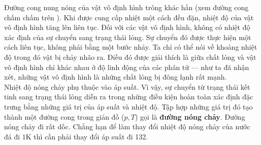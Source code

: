 Đường cong nung nóng của vật vô định hình trông khác hẳn (xem đường cong chấm chấm trên ). Khi được cung cấp nhiệt một cách đều đặn, nhiệt độ của vật vô định hình tăng lên liên tục. Đối với các vật vô định hình, không có nhiệt độ xác định của sự chuyển sang trạng thái lỏng. Sự chuyển đó được thực hiện một cách liên tục, không phải bằng một bước nhảy. Ta chỉ có thể nói về khoảng nhiệt độ trong đó vật bị chảy nhão ra. Điều đó được giải thích là giữa chất lỏng và vật vô định hình chỉ khác nhau ở độ linh động của các phân tử --- như ta đã nhận xét, những vật vô định hình là những chất lỏng bị đông lạnh rất mạnh.\\

Nhiệt độ nóng chảy phụ thuộc vào áp suất. Vì vậy, sự chuyển từ trạng thái kết tinh sang trạng thái lỏng diễn ra trong những điều kiện hoàn toàn xác định đặc trưng bằng những giá trị của áp suất và nhiệt độ. Tập hợp những giá trị đó tạo thành một đường cong trong giản đồ ($p,T$) gọi là \textbf{đường nóng chảy}. Đường nóng chảy đi rất dốc. Chẳng hạn để làm thay đổi nhiệt độ nóng chảy của nước đá đi $1$K thì cần phải thay đổi áp suất đi \SI{132}{\atm}.\\ 


